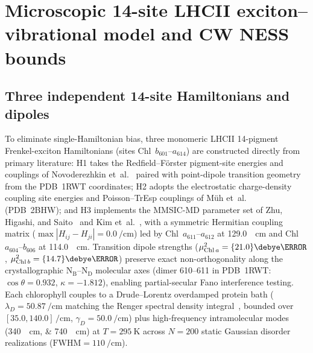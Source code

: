 \documentclass[preprint,12pt,a4paper]{elsarticle}
\begin{document}
\section{Microscopic 14-site LHCII exciton--vibrational model and CW NESS bounds}
\label{sec:sm_quantum}

\subsection{Three independent 14-site Hamiltonians and dipoles}
To eliminate single-Hamiltonian bias, three monomeric LHCII 14-pigment Frenkel-exciton Hamiltonians (sites Chl~$b_{601}$--$a_{614}$) are constructed directly from primary literature: H1 takes the Redfield--F\"orster pigment-site energies and couplings of Novoderezhkin et~al.~\cite{Novoderezhkin2011} paired with point-dipole transition geometry from the PDB~1RWT coordinates; H2 adopts the electrostatic charge-density coupling site energies and Poisson--TrEsp couplings of M\"uh et~al.~\cite{Muh2010} (PDB~2BHW); and H3 implements the MMSIC-MD parameter set of Zhu, Higashi, and Saito~\cite{Zhu2024JCTC} and Kim et~al.~\cite{Kim2025SciAdv}, with a symmetric Hermitian coupling matrix ($\max |H_{ij}-H_{ji}| = \qty{0.0}{\per\centi\meter}$) led by Chl~$a_{611}$--$a_{612}$ at \qty{+129.0}{\per\centi\meter} and Chl~$a_{604}$--$b_{606}$ at \qty{+114.0}{\per\centi\meter}. Transition dipole strengths ($\mu_{\mathrm{Chl}\,a}^2 = \qty{21.0}{\debye\squared}$, $\mu_{\mathrm{Chl}\,b}^2 = \qty{14.7}{\debye\squared}$) preserve exact non-orthogonality along the crystallographic $\mathrm{N_B}$--$\mathrm{N_D}$ molecular axes (dimer 610--611 in PDB~1RWT: $\cos\theta=\num{+0.932}$, $\kappa=\num{-1.812}$), enabling partial-secular Fano interference testing. Each chlorophyll couples to a Drude--Lorentz overdamped protein bath ($\lambda_D = \qty{50.87}{\per\centi\meter}$ matching the Renger spectral density integral~\cite{Kim2025SciAdv}, bounded over $[\num{35.0}, \num{140.0}]\,\unit{\per\centi\meter}$, $\gamma_D = \qty{50.0}{\per\centi\meter}$) plus high-frequency intramolecular modes (\qtylist{340;740}{\per\centi\meter}) at $T=\qty{295}{\kelvin}$ across $N=\num{200}$ static Gaussian disorder realizations ($\mathrm{FWHM}=\qty{110}{\per\centi\meter}$).
\end{document}
